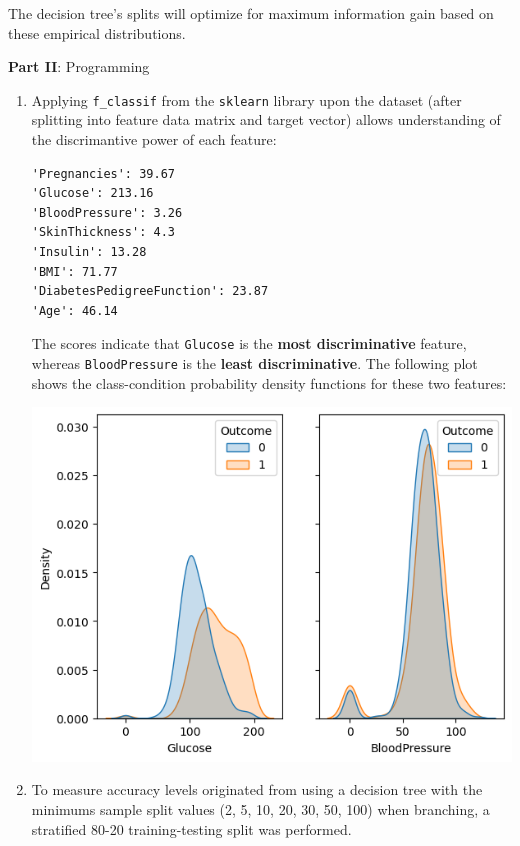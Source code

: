 \documentclass[12pt]{article}
\begin{document}
\begin{enumerate}[leftmargin=\labelsep, label=\textbf{\arabic*.)}]
\begin{itemize}
                    The decision tree's splits will optimize for maximum information gain based on these empirical distributions.

          \end{itemize}
\end{enumerate}

\large{\textbf{Part II}: Programming}\normalsize

\begin{enumerate}[leftmargin=\labelsep, label=\textbf{\arabic*.)}]
    \item Applying \texttt{f\_classif} from the \texttt{sklearn} library upon the dataset (after splitting into feature data matrix and target vector) allows understanding of the discrimantive power of each feature: \vskip 0.25cm
          \begin{lstlisting}[basicstyle=\ttfamily\centering]
'Pregnancies': 39.67
'Glucose': 213.16
'BloodPressure': 3.26
'SkinThickness': 4.3
'Insulin': 13.28
'BMI': 71.77
'DiabetesPedigreeFunction': 23.87
'Age': 46.14
        \end{lstlisting}
          The scores indicate that \texttt{Glucose} is the \textbf{most discriminative} feature, whereas \texttt{BloodPressure} is the \textbf{least discriminative}.
          The following plot shows the class-condition probability density functions for these two features:\vskip 0.25cm
          \begin{center}
              \includegraphics{discrimantive_features_dense_probability.png}
          \end{center}
    \item To measure accuracy levels originated from using a decision tree with the minimums sample split values (2, 5, 10, 20, 30, 50, 100) when branching, a stratified 80-20 training-testing split was performed.


\end{enumerate}
\end{document}
